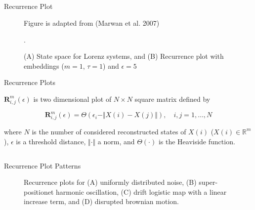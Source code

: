 \subsection{}
{

\begin{frame}{Recurrence Plot}
    \begin{figure}
		{Figure is adapted from (Marwan et al. 2007)}
	\caption{(A) State space for Lorenz systems, and 
		(B) Recurrence plot with embeddings ($m=1$, $\tau=1$) and $\epsilon=5$}. 
   \end{figure}

\end{frame}
}




{

\begin{frame}{Recurrence Plots}


$\mathbf{R}^{m}_{i,j} (\epsilon)$ is two dimensional plot of $N \times N$ square matrix
defined by

\begin{equation*}
\mathbf{R}^{m}_{i,j} (\epsilon) = 
\Theta ( \epsilon_i - \Vert X(i) - X(j) \Vert ), 
\quad i,j=1,\dots,N
\end{equation*}

where $N$ is the number of considered reconstructed states of $X(i)$
($X(i) \in \mathbb{R}^m$), 
$\epsilon$ is a threshold distance, 
$ \Vert  \cdot \Vert$ a norm, 
and $\Theta( \cdot )$ is the Heaviside function.

\end{frame}
}




\subsection{}
{

\begin{frame}{Recurrence Plot Patterns}
    \begin{figure}
	\caption{Recurrence plots for (A) uniformly distributed noise,
		(B) super-positionet harmonic oscillation,
		(C) drift logistic map with a linear increase term, and
		(D) disrupted brownian motion.
		} 
   \end{figure}
	
\end{frame}
}


